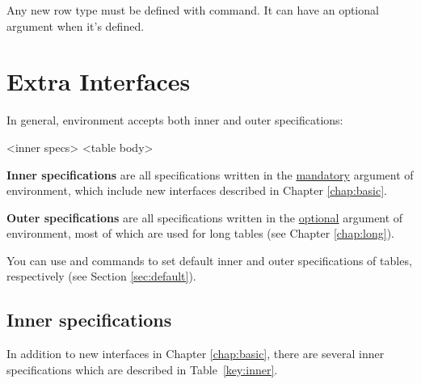 \documentclass[oneside]{book}
\begin{document}
Any new row type must be defined with \CC{\NewTblrRowType} command.
It can have an optional argument when it's defined.

\chapter{Extra Interfaces}
\label{chap:extra}

In general,  environment accepts both inner and outer specifications:

\begin{codehigh}
\begin{tblr}{<inner specs>}
  <table body>
\end{tblr}
\end{codehigh}

\textbf{Inner specifications} are all specifications written in the \underline{mandatory} argument
of  environment, which include new interfaces described in Chapter \ref{chap:basic}.

\textbf{Outer specifications} are all specifications written in the \underline{optional} argument
of  environment, most of which are used for long tables (see Chapter \ref{chap:long}).

You can use \CC{\SetTblrInner} and \CC{\SetTblrOuter} commands
to set default inner and outer specifications of tables, respectively (see Section \ref{sec:default}).

\section{Inner specifications}

In addition to new interfaces in Chapter \ref{chap:basic},
there are several inner specifications which are described in Table~\ref{key:inner}.
\end{document}

